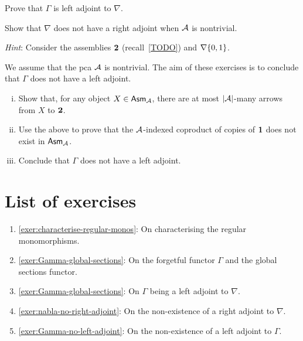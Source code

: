 \begin{exercise}\label{exer:Gamma-left-adjoint-to-nabla}
  Prove that \(\Gamma\) is left adjoint to \(\nabla\).
\end{exercise}

\begin{exercise}\label{exer:nabla-no-right-adjoint}
  Show that \(\nabla\) does not have a right adjoint when \(\AA\) is nontrivial.

  \emph{Hint}: Consider the assemblies \(\Two\) (recall~\cref{TODO}) and \(\nabla\set{0,1}\).
\end{exercise}

\begin{exercise}\label{exer:Gamma-no-left-adjoint}
  We assume that the pca \(\AA\) is nontrivial. The aim of these exercises is to
  conclude that \(\Gamma\) does not have a left adjoint.
  \begin{enumerate}[(i)]
  \item Show that, for any object \(X \in \Asm{\AA}\), there are at most
    \(\carrier{\AA}\)-many arrows from \(X\) to \(\Two\).
  \item Use the above to prove that the \(\AA\)-indexed coproduct of copies of
    \(\One\) does not exist in \(\Asm{\AA}\).
  \item Conclude that \(\Gamma\) does not have a left adjoint.
  \end{enumerate}
\end{exercise}

\section{List of exercises}
\begin{enumerate}
\item \cref{exer:characterise-regular-monos}: On characterising the regular
  monomorphisms.
\item \cref{exer:Gamma-global-sections}: On the forgetful functor \(\Gamma\) and
  the global sections functor.
\item \cref{exer:Gamma-global-sections}: On \(\Gamma\) being a left adjoint to
  \(\nabla\).
\item \cref{exer:nabla-no-right-adjoint}: On the non-existence of a right
  adjoint to \(\nabla\).
\item \cref{exer:Gamma-no-left-adjoint}: On the non-existence of a left
  adjoint to \(\Gamma\).
\end{enumerate}

